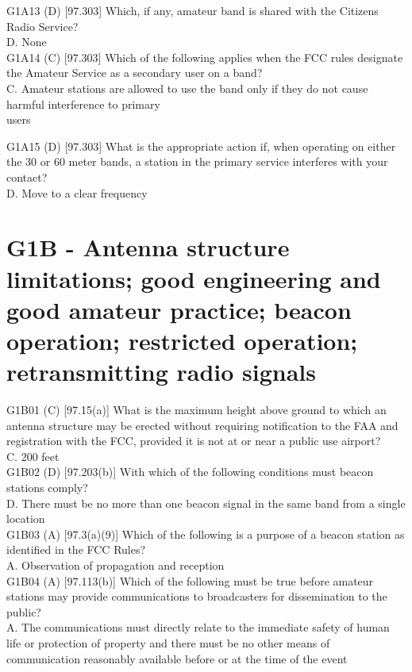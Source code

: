 \documentclass[12pt,letterpaper]{report}
\begin{document}
G1A13 (D) [97.303] Which, if any, amateur band is shared with the Citizens Radio Service?\\
D. None\\

G1A14 (C) [97.303] Which of the following applies when the FCC rules designate the Amateur Service as a secondary user on a band?\\
C. Amateur stations are allowed to use the band only if they do not cause harmful interference to primary\\ users

G1A15 (D) [97.303] What is the appropriate action if, when operating on either the 30 or 60 meter bands, a station in the primary service interferes with your contact? \\
D. Move to a clear frequency\\

\section{G1B - Antenna structure limitations; good engineering and good amateur practice; beacon operation; restricted operation; retransmitting radio signals}

G1B01 (C) [97.15(a)] What is the maximum height above ground to which an antenna structure may be erected without requiring notification to the FAA and registration with the FCC, provided it is not at or near a public use airport?\\
C. 200 feet\\

G1B02 (D) [97.203(b)] With which of the following conditions must beacon stations comply?\\
D. There must be no more than one beacon signal in the same band from a single location\\

G1B03 (A) [97.3(a)(9)] Which of the following is a purpose of a beacon station as identified in the FCC Rules?\\
A. Observation of propagation and reception\\

G1B04 (A) [97.113(b)] Which of the following must be true before amateur stations may provide communications to broadcasters for dissemination to the public?\\
A. The communications must directly relate to the immediate safety of human life or protection of property and there must be no other means of communication reasonably available before or at the time of the event\\
\end{document}
